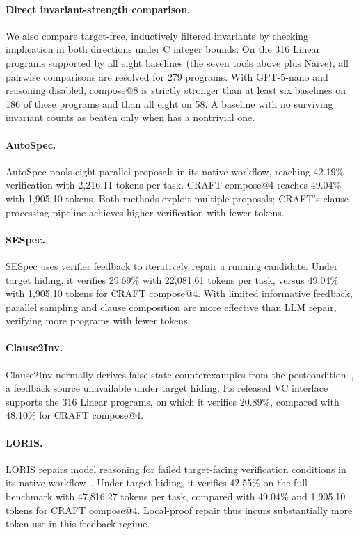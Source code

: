 \paragraph{Direct invariant-strength comparison.}
We also compare target-free, inductively filtered invariants by checking
implication in both directions under C integer bounds. On the 316 Linear
programs supported by all eight baselines (the seven tools above plus Naive),
all pairwise comparisons are resolved for 279 programs. With GPT-5-nano and
reasoning disabled, \sam{} compose@8 is strictly stronger than at least six
baselines on 186 of these programs and than all eight on 58. A baseline with
no surviving invariant counts as beaten only when \sam{} has a nontrivial one.

\paragraph{AutoSpec.}
AutoSpec pools eight parallel proposals in its native workflow, reaching
42.19\% verification with 2,216.11 tokens per task. CRAFT compose@4 reaches
49.04\% with 1,905.10 tokens. Both methods exploit multiple proposals;
CRAFT's clause-processing pipeline achieves higher verification with fewer
tokens.

\paragraph{SESpec.}
SESpec uses verifier feedback to iteratively repair a running candidate.
Under target hiding, it verifies 29.69\% with 22,081.61 tokens per task,
versus 49.04\% with 1,905.10 tokens for CRAFT compose@4. With limited
informative feedback, parallel sampling and clause composition are more
effective than LLM repair, verifying more programs with fewer tokens.

\paragraph{Clause2Inv.}
Clause2Inv normally derives false-state counterexamples from the
postcondition~\citep{cao2025clause2inv}, a feedback source unavailable under
target hiding. Its released VC interface supports the 316 Linear programs,
on which it verifies 20.89\%, compared with 48.10\% for CRAFT compose@4.

\paragraph{LORIS.}
LORIS repairs model reasoning for failed target-facing verification
conditions in its native workflow~\citep{li2026loris}. Under target hiding,
it verifies 42.55\% on the full benchmark with 47,816.27 tokens per task,
compared with 49.04\% and 1,905.10 tokens for CRAFT compose@4. Local-proof
repair thus incurs substantially more token use in this feedback regime.

